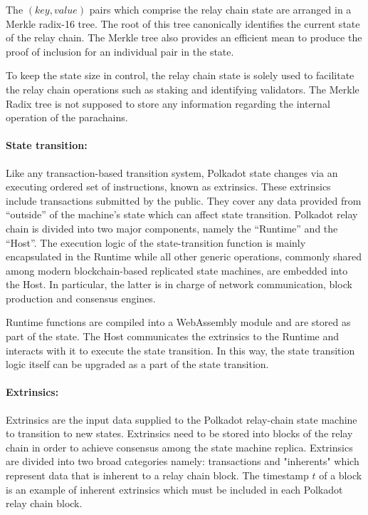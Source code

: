 \documentclass{article}
\begin{document}
The $(key, value)$ pairs which comprise the relay chain state are arranged in a Merkle radix-16 tree. The root of this tree canonically identifies the current state of the relay chain. The Merkle tree also provides an efficient mean to produce the  proof of inclusion for an individual pair in the state.

To keep the state size in control, the relay chain state is solely used to facilitate the relay chain operations such as staking and identifying validators. The Merkle Radix tree is not supposed to store any information regarding the internal operation of the parachains.

\paragraph{State transition: } \label{par:state_transition} Like any transaction-based transition system, Polkadot state changes via an executing ordered set of instructions, known as extrinsics. These extrinsics include transactions submitted by the public. They cover any data provided from ``outside'' of the machine's state which can affect state transition. Polkadot relay chain is divided into two major components, namely the ``Runtime'' and the ``Host''. The execution logic of the state-transition function is mainly encapsulated in the Runtime while all other generic operations, commonly shared among modern blockchain-based replicated state machines, are embedded into the Host. In particular, the latter is in charge of network communication, block production and consensus engines.

Runtime functions are compiled into a WebAssembly module and are stored as part of the state. The Host communicates the extrinsics to the Runtime and interacts with it to execute the state transition. In this way, the state transition logic itself can be upgraded as a part of the state transition.

\paragraph{Extrinsics:} \label{par:extrinsics}

Extrinsics are the input data supplied to the Polkadot relay-chain state machine to transition to new states. Extrinsics need to be stored into blocks of the relay chain in order to achieve consensus among the state machine replica. Extrinsics are divided into two broad categories namely: transactions and "inherents" which represent data that is inherent to a relay chain block. The timestamp $t$ of a block is an example of inherent extrinsics which must be included in each Polkadot relay chain block.
\end{document}
